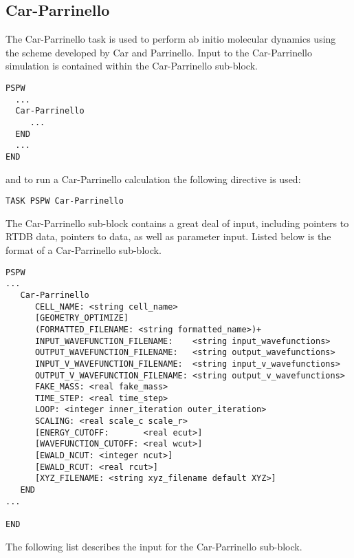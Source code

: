 \subsection{Car-Parrinello}
The Car-Parrinello task is used to perform ab initio molecular dynamics
using the scheme developed by Car and Parrinello. Input to the Car-Parrinello 
simulation is contained within the Car-Parrinello sub-block.
\begin{verbatim}
PSPW
  ...
  Car-Parrinello
     ...
  END
  ...
END
\end{verbatim}
and to run a Car-Parrinello calculation the following directive is used:
\begin{verbatim}
TASK PSPW Car-Parrinello 
\end{verbatim}
The Car-Parrinello sub-block contains a great deal
of input, including pointers to RTDB data, pointers to data, as well as
parameter input.  Listed below is the format of a Car-Parrinello sub-block.
\begin{verbatim}
PSPW
...
   Car-Parrinello
      CELL_NAME: <string cell_name>
      [GEOMETRY_OPTIMIZE]
      (FORMATTED_FILENAME: <string formatted_name>)+
      INPUT_WAVEFUNCTION_FILENAME:    <string input_wavefunctions>
      OUTPUT_WAVEFUNCTION_FILENAME:   <string output_wavefunctions>
      INPUT_V_WAVEFUNCTION_FILENAME:  <string input_v_wavefunctions>
      OUTPUT_V_WAVEFUNCTION_FILENAME: <string output_v_wavefunctions>
      FAKE_MASS: <real fake_mass>
      TIME_STEP: <real time_step>
      LOOP: <integer inner_iteration outer_iteration>
      SCALING: <real scale_c scale_r>
      [ENERGY_CUTOFF:       <real ecut>]
      [WAVEFUNCTION_CUTOFF: <real wcut>]
      [EWALD_NCUT: <integer ncut>]
      [EWALD_RCUT: <real rcut>]
      [XYZ_FILENAME: <string xyz_filename default XYZ>]
   END
...

END
\end{verbatim}
The following list describes the input for the Car-Parrinello
sub-block.
